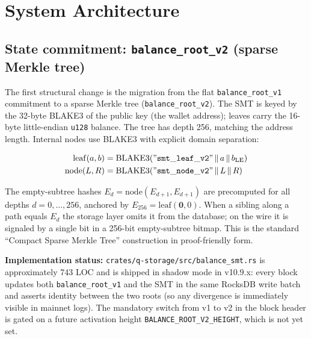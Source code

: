 \documentclass[11pt,a4paper]{article}
\begin{document}
\section{System Architecture}
\label{sec:architecture}

\subsection{State commitment: \texttt{balance\_root\_v2} (sparse Merkle tree)}

The first structural change is the migration from the flat
\texttt{balance\_root\_v1} commitment to a sparse Merkle tree
(\texttt{balance\_root\_v2}). The SMT is keyed by the 32-byte BLAKE3 of the
public key (the wallet address); leaves carry the 16-byte little-endian
\texttt{u128} balance. The tree has depth 256, matching the address length.
Internal nodes use BLAKE3 with explicit domain separation:

\[
  \begin{aligned}
    \mathrm{leaf}(a, b) &= \mathrm{BLAKE3}(\mathtt{"smt\_leaf\_v2"} \,\|\, a \,\|\, b_{\mathrm{LE}}) \\
    \mathrm{node}(L, R) &= \mathrm{BLAKE3}(\mathtt{"smt\_node\_v2"} \,\|\, L \,\|\, R)
  \end{aligned}
\]

The empty-subtree hashes
$E_d = \mathrm{node}(E_{d+1}, E_{d+1})$ are precomputed for all depths
$d = 0, \dots, 256$, anchored by $E_{256} = \mathrm{leaf}(\mathbf{0}, 0)$.
When a sibling along a path equals $E_d$ the storage layer omits it from
the database; on the wire it is signaled by a single bit in a 256-bit
empty-subtree bitmap. This is the standard ``Compact Sparse Merkle Tree''
construction in proof-friendly form.

\textbf{Implementation status:} \texttt{crates/q-storage/src/balance\_smt.rs}
is approximately 743 LOC and is shipped in shadow mode in
v10.9.x: every block updates both \texttt{balance\_root\_v1} and the
SMT in the same RocksDB write batch and asserts identity between the
two roots (so any divergence is immediately visible in mainnet logs).
The mandatory switch from v1 to v2 in the block header is gated on a
future activation height \texttt{BALANCE\_ROOT\_V2\_HEIGHT}, which is
not yet set.
\end{document}
